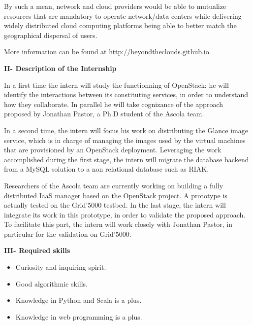 \documentclass{letter}
\begin{document}
\begin{letter}
By such a mean, network and cloud providers would be able to mutualize resources
that are mandatory to operate network/data centers while delivering widely 
distributed cloud computing platforms being able to better match the 
geographical dispersal of users.

More information can be found at 
\href{http://beyondtheclouds.github.io}{http://beyondtheclouds.github.io}.


{\Large \textbf{II- Description of the Internship}}

In a first time the intern will study the functionning of OpenStack: he will
identify the interactions between its constituting services, in order to 
understand how they collaborate. In parallel he will take cognizance of the
approach proposed by Jonathan Pastor, a Ph.D student of the Ascola team.

In a second time, the intern will focus his work on distributing the Glance 
image service, which is in charge of managing the images used by the virtual 
machines that are provisioned by an OpenStack deployment. Leveraging the work 
accomplished during the first stage, the intern will migrate the database 
backend from a MySQL solution to a non relational database such as RIAK.

Researchers of the Ascola team are currently working on building a fully 
distributed IaaS manager based on the OpenStack project. A prototype is actually
tested on the Grid'5000 testbed. In the last stage, the intern will 
integrate its work in this prototype, in order to validate the proposed 
approach. To facilitate this part, the intern will work closely with Jonathan 
Pastor, in particular for the validation on Grid'5000.

{\Large \textbf{III- Required skills}}

\begin{itemize}
\item Curiosity and inquiring spirit.
\item Good algorithmic skills.
\item Knowledge in Python and Scala is a plus.
\item Knowledge in web programming is a plus.
\end{itemize}

\end{letter}
\end{document}
